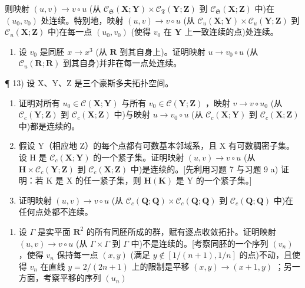 则映射 \((u, v) \to v \circ u\) (从 \(\mathcal{C}_{\mathfrak{S}}(\mathbf{X}; \mathbf{Y}) \times \mathcal{C}_{\mathfrak{T}}(\mathbf{Y}; \mathbf{Z})\) 到 \(\mathcal{C}_{\mathfrak{S}}(\mathbf{X}; \mathbf{Z})\) 中)在 \((u_0, v_0)\) 处连续。特别地，映射 \((u, v) \to v \circ u\) (从 \(\mathcal{C}_u(\mathbf{X}; \mathbf{Y}) \times \mathcal{C}_u(\mathbf{Y}; \mathbf{Z})\) 到 \(\mathcal{C}_u(\mathbf{X}; \mathbf{Z})\) 中)在每一点 \((u_0, v_0)\) (使得 \(v_0\) 在 \(\mathbf{Y}\) 上一致连续的点)处连续。

\begin{enumerate}
\def\labelenumi{\alph{enumi})}
\setcounter{enumi}{3}
\tightlist
\item
  设 \(v_0\) 是同胚 \(x \to x^3\) (从 \(\mathbf{R}\) 到其自身上)。证明映射 \(u \to v_0 \circ u\) (从 \(\mathcal{C}_u(\mathbf{R}; \mathbf{R})\) 到其自身)并非在每一点处连续。
\end{enumerate}

¶ 13) 设 X、Y、Z 是三个豪斯多夫拓扑空间。

\begin{enumerate}
\def\labelenumi{\alph{enumi})}
\item
  证明对所有 \(u_0 \in \mathcal{C}(\mathbf{X}; \mathbf{Y})\) 与所有 \(v_0 \in \mathcal{C}(\mathbf{Y}; \mathbf{Z})\) ，映射 \(v \to v \circ u_0\) (从 \(\mathcal{C}_c(\mathbf{Y}; \mathbf{Z})\) 到 \(\mathcal{C}_c(\mathbf{X}; \mathbf{Z})\) 中)与映射 \(u \to v_0 \circ u\) (从 \(\mathcal{C}_c(\mathbf{X}; \mathbf{Y})\) 到 \(\mathcal{C}_c(\mathbf{X}; \mathbf{Z})\) 中)都是连续的。
\item
  假设 Y（相应地 Z）的每个点都有可数基本邻域系，且 X 有可数稠密子集。设 H 是 \(\mathcal{C}_{c}(\mathbf{X};\mathbf{Y})\) 的一个紧子集。证明映射 \((u,v)\to v\circ u\) (从 \(\mathbf{H}\times\mathcal{C}_{c}(\mathbf{Y};\mathbf{Z})\) 到 \(\mathcal{C}_{c}(\mathbf{X};\mathbf{Z})\) 中)是连续的。{[}先利用习题 7 与习题 9 a) 证明：若 K 是 X 的任一紧子集，则 \(\mathbf{H}(\mathbf{K})\) 是 Y 的一个紧子集。{]}
\item
  证明映射 \((u, v) \to v \circ u\) (从 \(\mathcal{C}_c(\mathbf{Q}; \mathbf{Q}) \times \mathcal{C}_c(\mathbf{Q}; \mathbf{Q})\) 到 \(\mathcal{C}_c(\mathbf{Q}; \mathbf{Q})\) 中)在任何点处都不连续。
\end{enumerate}

\begin{enumerate}
\def\labelenumi{\arabic{enumi})}
\setcounter{enumi}{13}
\tightlist
\item
  设 \(\Gamma\) 是实平面 \(\mathbf{R}^2\) 的所有同胚所成的群，赋有逐点收敛拓扑。证明映射 \((u, v) \to v \circ u\) (从 \(\Gamma \times \Gamma\) 到 \(\Gamma\) 中)不是连续的。{[}考察同胚的一个序列 \((v_n)\) ，使得 \(v_n\) 保持每一点 \((x, y)\) (满足 \(y \notin [1/(n + 1), 1/n]\) 的点)不动，且使得 \(v_{n}\) 在直线 \(y = 2/(2n + 1)\) 上的限制是平移 \((x, y) \to (x + 1, y)\) ；另一方面，考察平移的序列 \((u_{n})\)
\end{enumerate}

